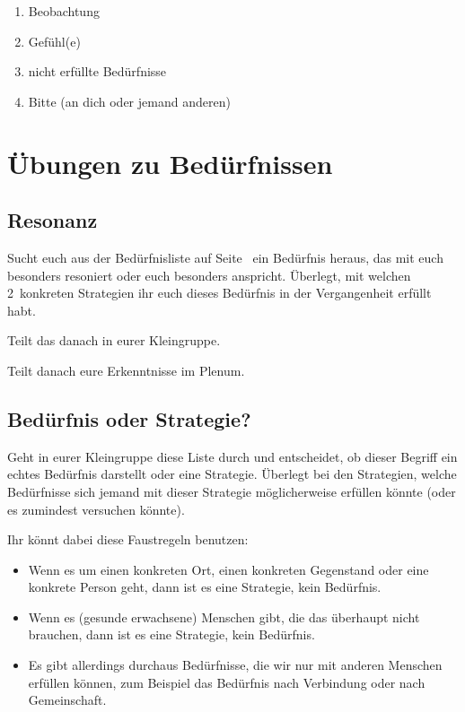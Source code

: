 \begin{enumerate}
    \item Beobachtung
    \item Gefühl(e)
    \item nicht erfüllte Bedürfnisse
    \item Bitte (an dich oder jemand anderen)
\end{enumerate}


\section{Übungen zu Bedürfnissen}

\subsection{Resonanz}

Sucht euch aus der Bedürfnisliste auf Seite~\pageref{beduerfnisse} ein Bedürfnis heraus, das mit euch besonders resoniert oder euch besonders anspricht. Überlegt, mit welchen 2~konkreten Strategien ihr euch dieses Bedürfnis in der Vergangenheit erfüllt habt.

Teilt das danach in eurer Kleingruppe.

Teilt danach eure Erkenntnisse im Plenum.

\subsection{Bedürfnis oder Strategie?}

Geht in eurer Kleingruppe diese Liste durch und entscheidet, ob dieser Begriff ein echtes Bedürfnis darstellt oder eine Strategie. Überlegt bei den Strategien, welche Bedürfnisse sich jemand mit dieser Strategie möglicherweise erfüllen könnte (oder es zumindest versuchen könnte).

Ihr könnt dabei diese Faustregeln benutzen:

\begin{itemize}
    \item Wenn es um einen konkreten Ort, einen konkreten Gegenstand oder eine konkrete Person geht, dann ist es eine Strategie, kein Bedürfnis.
    \item Wenn es (gesunde erwachsene) Menschen gibt, die das überhaupt nicht brauchen, dann ist es eine Strategie, kein Bedürfnis.
    \item Es gibt allerdings durchaus Bedürfnisse, die wir nur mit anderen Menschen erfüllen können, zum Beispiel das Bedürfnis nach Verbindung oder nach Gemeinschaft.
\end{itemize}

